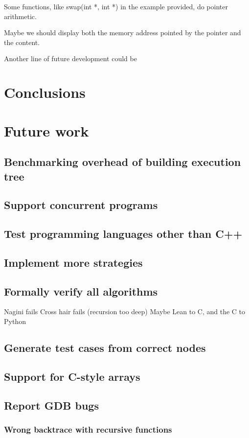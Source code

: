 Some functions, like swap(int *, int *) in the example provided, do pointer arithmetic.

Maybe we should display both the memory address pointed by the pointer and the content.

Another line of future development could be 

\section{Conclusions}
\section{Future work}
\subsection{Benchmarking overhead of building execution tree}
\subsection{Support concurrent programs}
\subsection{Test programming languages other than C++}
\subsection{Implement more strategies}
\subsection{Formally verify all algorithms}
Nagini fails
Cross hair fails (recursion too deep)
Maybe Lean to C, and the C to Python
\subsection{Generate test cases from correct nodes}
\subsection{Support for C-style arrays}
\subsection{Report GDB bugs}
\subsubsection{Wrong backtrace with recursive functions}
